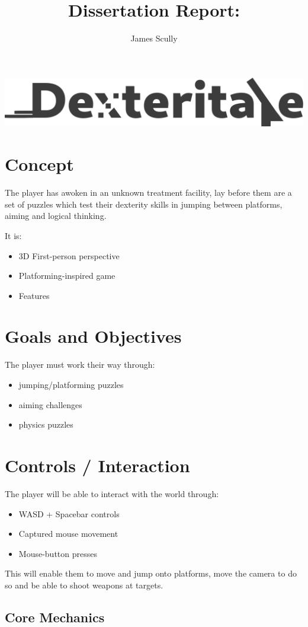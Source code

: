 \documentclass[11pt]{article}
\title{Dissertation Report: \pt}
\author{James Scully}
\begin{document}
\begin{center}
\includegraphics[width=0.75\linewidth]{logo} 
\end{center}

\section*{Concept}
The player has awoken in an unknown treatment facility, lay before them are a set of puzzles which test their dexterity skills in jumping between platforms, aiming and logical thinking. 

It is:

\begin{itemize}
	\item 3D First-person perspective 
	\item Platforming-inspired game
	\item Features
\end{itemize}

\section*{Goals and Objectives}

The player must work their way through:

\begin{itemize}
	\item jumping/platforming puzzles
	\item aiming challenges 
	\item physics puzzles
\end{itemize}

\section*{Controls / Interaction}
The player will be able to interact with the world through:
\begin{itemize}
	\item WASD + Spacebar controls 
	\item Captured mouse movement
	\item Mouse-button presses \\
\end{itemize}

This will enable them to move and jump onto platforms, move the camera to do so and be able to shoot weapons at targets.




\subsection{Core Mechanics}
\end{document}

